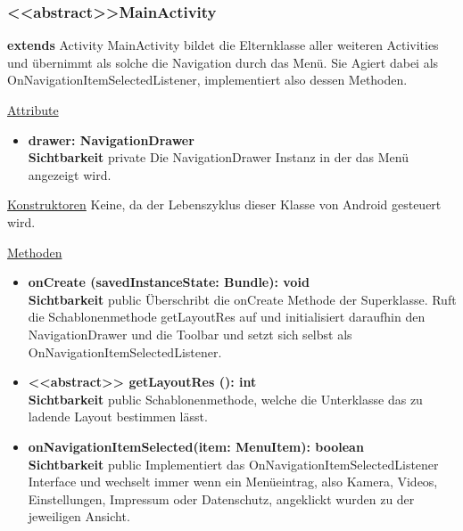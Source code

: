 \subsubsection{<<abstract>>MainActivity}
\textbf{extends} Activity \newline
MainActivity bildet die Elternklasse aller weiteren Activities und übernimmt als solche die Navigation durch das Menü. Sie Agiert dabei als OnNavigationItemSelectedListener, implementiert also dessen Methoden.
\newline

\underline{Attribute}
\begin{itemize}
\itemsep0pt
\item \textbf{drawer: NavigationDrawer} \hfill\\ 
\textbf{Sichtbarkeit} private\newline
Die NavigationDrawer Instanz in der das Menü angezeigt wird.

\end{itemize}

\underline{Konstruktoren}\newline
\indent Keine, da der Lebenszyklus dieser Klasse von Android gesteuert wird.\newline

\underline{Methoden}
\begin{itemize}
\itemsep0pt

\item \textbf{onCreate (savedInstanceState: Bundle): void}\hfill\\
\textbf{Sichtbarkeit} public\newline
Überschribt die onCreate Methode der Superklasse. Ruft die Schablonenmethode getLayoutRes auf und initialisiert daraufhin den NavigationDrawer und die Toolbar und setzt sich selbst als OnNavigationItemSelectedListener.

\label{app:containeractivity:methode:getLayoutRes}\item \textbf{ <<abstract>> getLayoutRes (): int}\hfill\\
\textbf{Sichtbarkeit} public\newline
Schablonenmethode, welche die Unterklasse das zu ladende Layout bestimmen lässt.

\item \textbf{onNavigationItemSelected(item: MenuItem): boolean}\hfill\\
\textbf{Sichtbarkeit} public\newline
Implementiert das OnNavigationItemSelectedListener Interface und wechselt immer wenn ein Menüeintrag, also Kamera, Videos, Einstellungen, Impressum oder Datenschutz, angeklickt wurden zu der jeweiligen Ansicht.

\end{itemize}